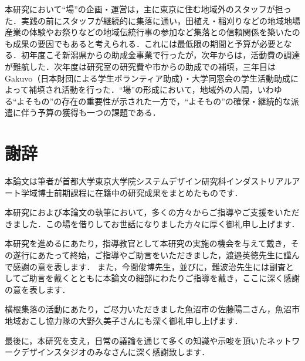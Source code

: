 \documentclass[a4paper]{jsarticle}
\begin{document}
本研究において“場”の企画・運営は，主に東京に住む地域外のスタッフが担った．実践の前にスタッフが継続的に集落に通い，田植え・稲刈りなどの地域地場産業の体験やお祭りなどの地域伝統行事の参加など集落との信頼関係を築いたのも成果の要因でもあると考えられる．これには最低限の期間と予算が必要となる．初年度こそ新潟県からの助成金事業で行ったが，次年からは，活動費の調達が難航した．次年度は研究室の研究費や市からの助成での補填，三年目はGakuvo（日本財団による学生ボランティア助成）・大学同窓会の学生活動助成によって補填され活動を行った．“場”の形成において，地域外の人間，いわゆる“よそもの”の存在の重要性が示された一方で，“よそもの”の確保・継続的な派遣に伴う予算の獲得も一つの課題である．\par


\newpage
\section*{謝辞}
\par
本論文は筆者が首都大学東京大学院システムデザイン研究科インダストリアルアート学域博士前期課程に在籍中の研究成果をまとめたものです．
\par
本研究におよび本論文の執筆において，多くの方々からご指導やご支援をいただきました．この場を借りしてお世話になりました方々に厚く御礼申し上げます．
\par
本研究を進めるにあたり，指導教官として本研究の実施の機会を与えて戴き，その遂行にあたって終始，ご指導やご助言をいただきました，渡邉英徳先生に謹んで感謝の意を表します．
また，今間俊博先生，並びに，難波治先生には副査としてご助言を戴くとともに本論文の細部にわたりご指導を戴き，ここに深く感謝の意を表します．
\par
横根集落の活動にあたり，ご尽力いただきました魚沼市の佐藤陽二さん，魚沼市地域おこし協力隊の大野久美子さんにも深く御礼申し上げます．
\par
最後に，本研究を支え，日常の議論を通じて多くの知識や示唆を頂いたネットワークデザインスタジオのみなさんに深く感謝致します．
\newpage
\end{document}
